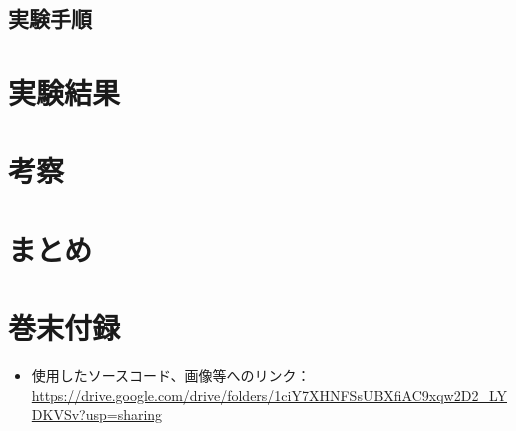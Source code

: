 \documentclass[dvipdfmx]{jsarticle}
\begin{document}
  \subsection{実験手順}

\section{実験結果}
\section{考察}
\section{まとめ}


\section{巻末付録}
\begin{itemize}
  \item 使用したソースコード、画像等へのリンク：\url{https://drive.google.com/drive/folders/1ciY7XHNFSsUBXfiAC9xqw2D2_LYDKVSv?usp=sharing}
\end{itemize}
\begin{thebibliography}{99}

\end{thebibliography}
\end{document}
